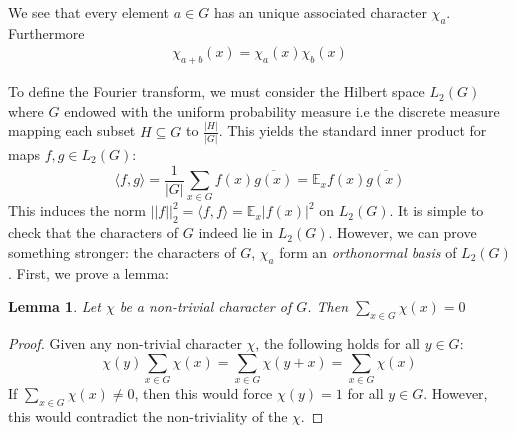 \documentclass{amsart}
\newtheorem{lemma}[theorem]{Lemma}
\theoremstyle{definition}
\theoremstyle{remark}
\numberwithin{equation}{section}
\theoremstyle{remark}
\begin{document}
We see that every element $a \in G$ has an unique associated character $\chi_a$. Furthermore
%
\begin{gather} \label{chargroup}
  \chi_{a+b}(x)  = \chi_{a}(x)\chi_{b}(x)
\end{gather}

To define the Fourier transform, we must consider the Hilbert space $L_2(G)$ where $G$ endowed with the uniform probability measure i.e the discrete measure mapping each subset $H \subseteq G$ to $\frac{|H|}{|G|}$. This yields the standard inner product for maps $f,g \in L_2(G)$: \newline
%
\begin{equation}
  \langle f,g \rangle = \frac{1}{|G|}\sum_{x\in G} f(x)\overline{g(x)}= \mathbb{E}_x f(x)\overline{g(x)}
\end{equation}
%
This induces the norm $||f||_2^2 = \langle f, f \rangle = \mathbb{E}_x |f(x)|^2$ on $L_2(G)$. It is simple to check that the characters of $G$ indeed lie in $L_2(G)$. However, we can prove something stronger: the characters of $G$, $\chi_a$ form an \emph{orthonormal basis} of $L_2(G)$.
%
First, we prove a lemma:
\begin{lemma} \label{totalsum}
  Let $\chi$ be a non-trivial character of $G$. Then $\sum_{x \in G} \chi(x) = 0$
\end{lemma}
%
\begin{proof}
  Given any non-trivial character $\chi$, the following holds for all $y \in G$: \newline
    \[ \chi(y)\sum_{x \in G} \chi(x) = \sum_{x \in G} \chi(y+x) = \sum_{x \in G} \chi(x) \]\newline
    If $\sum_{x \in G} \chi(x) \neq 0$, then this would force $\chi(y) = 1$ for all $y \in G$. However, this would contradict the non-triviality of the $\chi$.
\end{proof}
\end{document}
